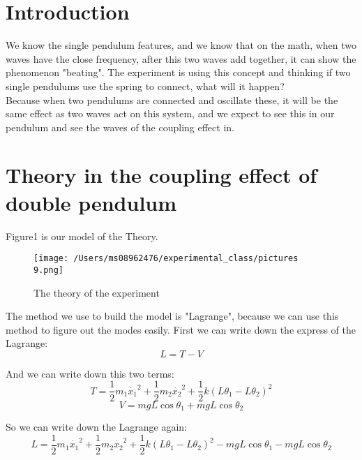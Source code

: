 \documentclass[final,1p,11pt]{elsarticle}
\begin{document}

\section{Introduction}

We know the single pendulum features, and we know that on the math, when two waves have the close frequency, after this two waves add together, it can show the phenomenon "beating". The experiment is using this concept and thinking if two single pendulums use the spring to connect, what will it happen?\\

Because when two pendulums are connected and oscillate these, it will be the same effect as two waves act on this system, and we expect to see this in our pendulum and see the waves of the coupling effect in. 

\section{Theory in the coupling effect of double pendulum}
Figure1 is our model of the Theory.\\
\begin{figure}
\caption{The theory of the experiment}
\centering
\texttt{[image: /Users/ms08962476/experimental\_class/pictures 9.png]}
\end{figure} 

The method we use to build the model is "Lagrange", because we can use this method to figure out the modes easily.
First we can write down the express of the Lagrange:
\begin{equation}
L=T-V
\end{equation}

And we can write down this two terms:
\begin{equation}
T=\frac{1}{2} m_1\dot{x_1}^2+\frac{1}{2} m_2\dot{x_2}^2+\frac{1}{2}k(L\theta_1-L\theta_2)^2
\end{equation}
\begin{equation}
V=mgL\cos\theta_1+mgL\cos\theta_2
\end{equation}

So we can write down the Lagrange again:
\begin{equation}
L=\frac{1}{2} m_1\dot{x_1}^2+\frac{1}{2} m_2\dot{x_2}^2+\frac{1}{2}k(L\theta_1-L\theta_2)^2-mgL\cos\theta_1-mgL\cos\theta_2
\end{equation}
\end{document}
